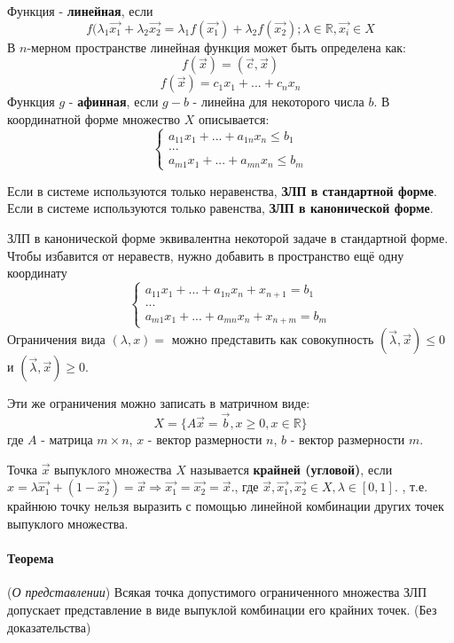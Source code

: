 \documentclass[a4paper, 14pt]{extarticle}
\numberwithin{equation}{section}
\begin{document}
Функция - \textbf{линейная}, если
\[
	f(\lambda_1 \vec{x_1} + \lambda_2 \vec{x_2} = \lambda_1 f(\vec{x_1}) + \lambda_2 f(\vec{x_2}); \lambda \in \mathbb{R}, \vec{x_i} \in X
\]
В $n$-мерном пространстве линейная функция может быть определена как:
\[ f(\vec{x}) = (\vec{c}, \vec{x})   \]
\[ f(\vec{x}) = c_1 x_1 + ... + c_n x_n \]
Функция $g$ - \textbf{афинная}, если $g-b$ - линейна для некоторого числа $b$. 
В координатной форме множество $X$ описывается:
\[
	\begin{cases}
		a_{11}x_1 + ... + a_{1n}x_n \le b_1\\
		...\\
		a_{m1}x_1 + ... + a_{mn}x_n \le b_m
	\end{cases}
\]

Если в системе используются только неравенства, \textbf{ЗЛП в стандартной форме}. Если в системе используются только равенства, \textbf{ЗЛП в канонической форме}. 

ЗЛП в канонической форме эквивалентна некоторой задаче в стандартной форме. Чтобы избавится от неравеств, нужно добавить в пространство ещё одну координату
\[
	\begin{cases}
		a_{11}x_1 + ... + a_{1n}x_n + x_{n+1} = b_1\\
		...\\
		a_{m1}x_1 + ... + a_{mn}x_n + x_{n+m} = b_m
	\end{cases}
\]
Ограничения вида $(\lambda, x) = $ можно представить как совокупность $(\vec{\lambda}, \vec{x}) \le 0$ и $(\vec{\lambda}, \vec{x}) \ge 0$. 

Эти же ограничения можно записать в матричном виде: 
\[ X = \{A\vec{x} = \vec{b}, x \ge 0, x \in \mathbb{R} \}  \]
где $A$ - матрица $m \times n$, $x$ - вектор размерности $n$, $b$ - вектор размерности $m$. 

Точка $\vec{x}$ выпуклого множества $X$ называется \textbf{крайней (угловой)}, если 
$
x = \lambda \vec{x_1} + (1 - \vec{x_2}) = \vec{x} \Rightarrow 
\vec{x_1} = \vec{x_2} = \vec{x}.
$, где $\vec{x}, \vec{x_1}, \vec{x_2} \in X, \lambda \in [0, 1]$. 
, т.е. крайнюю точку нельзя выразить с помощью линейной комбинации других точек выпуклого множества.

\paragraph{Теорема} (\textit{О представлении}) Всякая точка допустимого ограниченного
множества ЗЛП допускает представление в виде выпуклой комбинации его
крайних точек. (Без доказательства)
\end{document}
